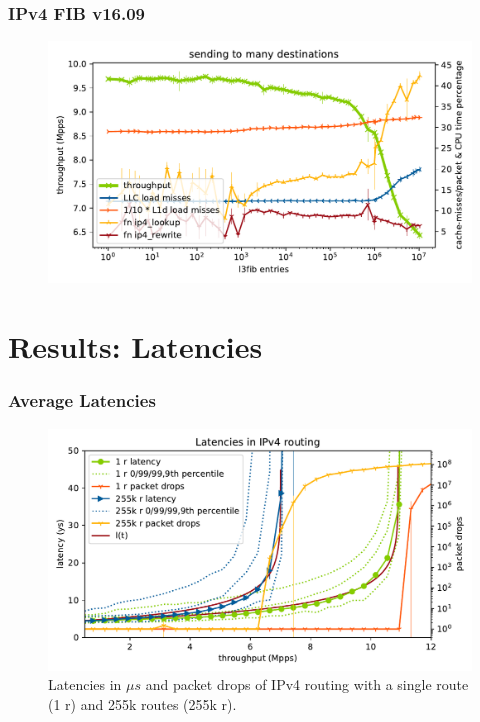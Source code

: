 \begin{frame}
    \frametitle{IPv4 FIB v16.09}
    \begin{figure}[!ht]
    \noindent\hspace{0.5mm}\includegraphics[width=\linewidth]{pics/throughput_l3_routes_klaipeda_v1609_32ghz_v3.pdf}
    \label{graph:ip4fiblegacy}
    \end{figure}
\end{frame}

\section{Results: Latencies}

\begin{frame}
    \frametitle{Average Latencies}


    \begin{figure}[!ht]
    \noindent\hspace{0.5mm}\includegraphics[width=\linewidth]{pics/latencies_per_throughput_summary_ip4.pdf}
    \caption{Latencies in $\mu s$ and packet drops of IPv4 routing with a single route (1 r) and 255k routes (255k r). }
    \label{graph:latencyoverview}
    \end{figure}
\end{frame}


